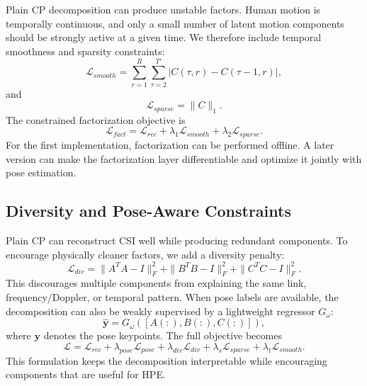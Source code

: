 \documentclass[10pt,journal]{IEEEtran}
\begin{document}
Plain CP decomposition can produce unstable factors. Human motion is temporally continuous, and only a small number of latent motion components should be strongly active at a given time. We therefore include temporal smoothness and sparsity constraints:
\begin{equation}
    \mathcal{L}_{smooth}
    =
    \sum_{r=1}^{R}\sum_{\tau=2}^{T'}
    |C(\tau,r)-C(\tau-1,r)|,
\end{equation}
and
\begin{equation}
    \mathcal{L}_{sparse}=\|C\|_1.
\end{equation}
The constrained factorization objective is
\begin{equation}
    \mathcal{L}_{fact}
    =
    \mathcal{L}_{rec}
    +
    \lambda_1\mathcal{L}_{smooth}
    +
    \lambda_2\mathcal{L}_{sparse}.
    \label{eq:fact_loss}
\end{equation}
For the first implementation, factorization can be performed offline. A later version can make the factorization layer differentiable and optimize it jointly with pose estimation.

\subsection{Diversity and Pose-Aware Constraints}

Plain CP can reconstruct CSI well while producing redundant components. To encourage physically cleaner factors, we add a diversity penalty:
\begin{equation}
    \mathcal{L}_{div}
    =
    \|A^TA-I\|_F^2
    +
    \|B^TB-I\|_F^2
    +
    \|C^TC-I\|_F^2.
\end{equation}
This discourages multiple components from explaining the same link, frequency/Doppler, or temporal pattern. When pose labels are available, the decomposition can also be weakly supervised by a lightweight regressor $G_\omega$:
\begin{equation}
    \hat{\mathbf{y}}
    =
    G_\omega([A(:),B(:),C(:)]),
\end{equation}
where $\mathbf{y}$ denotes the pose keypoints. The full objective becomes
\begin{equation}
    \mathcal{L}
    =
    \mathcal{L}_{rec}
    +
    \lambda_{pose}\mathcal{L}_{pose}
    +
    \lambda_{div}\mathcal{L}_{div}
    +
    \lambda_s\mathcal{L}_{sparse}
    +
    \lambda_t\mathcal{L}_{smooth}.
\end{equation}
This formulation keeps the decomposition interpretable while encouraging components that are useful for HPE.
\end{document}

